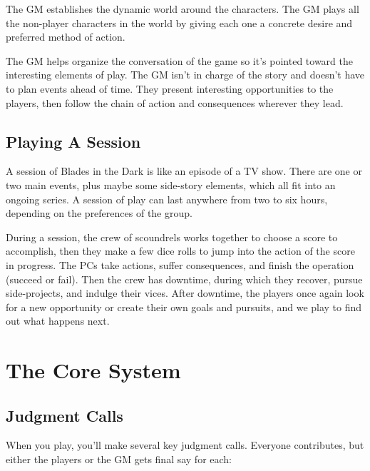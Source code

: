 \documentclass[11pt,oneside]{book}
\begin{document}
The GM establishes the dynamic world around the characters. The GM plays all the non-player characters in the world by giving each one a concrete desire and preferred method of action.

The GM helps organize the conversation of the game so it’s pointed toward the interesting elements of play. The GM isn’t in charge of the story and doesn’t have to plan events ahead of time. They present interesting opportunities to the players, then follow the chain of action and consequences wherever they lead.

\section{Playing A Session}

A session of Blades in the Dark is like an episode of a TV show. There are one or two main events, plus maybe some side-story elements, which all fit into an ongoing series. A session of play can last anywhere from two to six hours, depending on the preferences of the group.

During a session, the crew of scoundrels works together to choose a score to accomplish, then they make a few dice rolls to jump into the action of the score in progress. The PCs take actions, suffer consequences, and finish the operation (succeed or fail). Then the crew has downtime, during which they recover, pursue side-projects, and indulge their vices. After downtime, the players once again look for a new opportunity or create their own goals and pursuits, and we play to find out what happens next.

\chapter{The Core System}

\section{Judgment Calls}

When you play, you’ll make several key judgment calls. Everyone contributes, but either the players or the GM gets final say for each:
\end{document}
